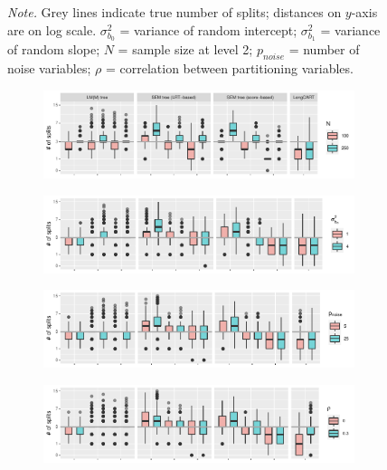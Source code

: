 \documentclass[doc,floatsintext,natbib]{apa7}
\begin{document}
\begin{figure}[!ht]
\begin{subfigure}{1.25\textwidth}
\end{subfigure}
{\footnotesize \textit{Note.} Grey lines indicate true number of splits; distances on $y$-axis are on log scale. $\sigma_{b_0}^2$ = variance of random intercept; $\sigma_{b_1}^2$ = variance of random slope; $N$ = sample size at level 2; $p_{noise}$ = number of noise variables; $\rho$ = correlation between partitioning variables.}
\label{fig:LMM_sizes_interact}
\end{figure}





\begin{figure}[!ht]
\caption{Effect of data-generating parameters on tree size for LM(M), SEM and LongCART trees.}
\begin{subfigure}{1.25\textwidth}
\includegraphics{_Partitioning_GCMs_with_GLMM_trees-037}
\end{subfigure}
\begin{subfigure}{1.25\textwidth}
\includegraphics{_Partitioning_GCMs_with_GLMM_trees-038}
\end{subfigure}
\begin{subfigure}{1.25\textwidth}
\includegraphics{_Partitioning_GCMs_with_GLMM_trees-039}
\end{subfigure}
\begin{subfigure}{1.25\textwidth}
\includegraphics{_Partitioning_GCMs_with_GLMM_trees-040}

\end{subfigure}
\end{figure}
\end{document}

